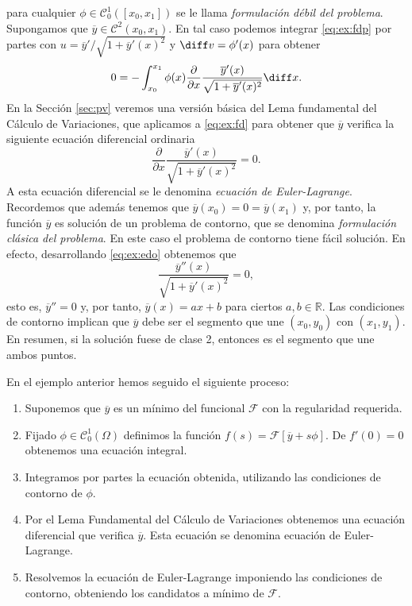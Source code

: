 \documentclass{article}
\begin{document}
\begin{ex}
  para cualquier $\phi \in \mathcal{C}^1_0([x_0, x_1])$ se le llama \emph{formulación débil del
    problema}. Supongamos que $\overline{y} \in \mathcal{C}^2(x_0, x_1)$. En tal caso podemos
  integrar \eqref{eq:ex:fdp} por partes con $u = \overline{y}'/\sqrt{1 + \overline{y}'(x)^2}$ y
  $\diff v = \phi'(x)$ para obtener
  \begin{equation} \label{eq:ex:fd} 0 = -\int_{x_0}^{x_1} \phi(x) \frac{\partial}{\partial
      x}\frac{\overline{y}'(x)}{\sqrt{1 + \overline{y}'(x)^2}} \diff x.
  \end{equation}
  En la Sección \ref{sec:pv} veremos una versión básica del Lema fundamental del Cálculo de
  Variaciones, que aplicamos a \eqref{eq:ex:fd} para obtener que $\overline{y}$ verifica la
  siguiente ecuación diferencial ordinaria
  \begin{equation} \label{eq:ex:edo} \frac{\partial}{\partial x}\frac{\overline{y}'(x)}{\sqrt{1 +
        \overline{y}'(x)^2}} = 0.
  \end{equation}
  A esta ecuación diferencial se le denomina \emph{ecuación de Euler-Lagrange}. Recordemos que
  además tenemos que $\overline{y}(x_0) = 0 = \overline{y}(x_1)$ y, por tanto, la función
  $\overline{y}$ es solución de un problema de contorno, que se denomina \emph{formulación clásica
    del problema}. En este caso el problema de contorno tiene fácil solución. En efecto,
  desarrollando \eqref{eq:ex:edo} obtenemos que
  \[ \frac{\overline{y}''(x)}{\sqrt{1 + \overline{y}'(x)^2}} = 0,\] esto es, $\overline{y}'' = 0$ y,
  por tanto, $\overline{y}(x) = ax+b$ para ciertos $a, b \in \mathbb{R}$. Las condiciones de
  contorno implican que $\overline{y}$ debe ser el segmento que une $(x_0, y_0)$ con $(x_1,
  y_1)$. En resumen, si la solución fuese de clase 2, entonces es el segmento que une ambos puntos.
\end{ex}

En el ejemplo anterior hemos seguido el siguiente proceso:
\begin{enumerate}
\item Suponemos que $\overline{y}$ es un mínimo del funcional $\mathcal{F}$ con la regularidad
  requerida.
\item Fijado $\phi \in \mathcal{C}_0^1(\Omega)$ definimos la función
  $f(s) = \mathcal{F}[\overline{y} + s \phi]$. De $f'(0) = 0$ obtenemos una ecuación integral.
\item Integramos por partes la ecuación obtenida, utilizando las condiciones de contorno de $\phi$.
\item Por el Lema Fundamental del Cálculo de Variaciones obtenemos una ecuación diferencial que
  verifica $\overline{y}$. Esta ecuación se denomina ecuación de Euler-Lagrange.
\item\label{item:candidatos} Resolvemos la ecuación de Euler-Lagrange imponiendo las condiciones de
  contorno, obteniendo los candidatos a mínimo de $\mathcal{F}$.
\end{enumerate}
\end{document}
